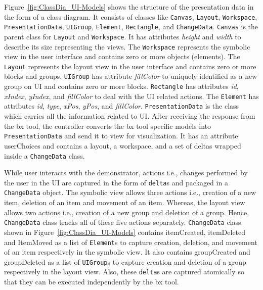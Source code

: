 Figure~\ref{fig:ClassDia_UI-Models} shows the structure of the presentation data in the form of a class diagram. It consists of classes like \texttt{Canvas}, \texttt{Layout}, \texttt{Workspace}, \texttt{PresentationData}, \texttt{UIGroup}, \texttt{Element}, \texttt{Rectangle}, and \texttt{ChangeData}. \texttt{Canvas} is the parent class for \texttt{Layout} and \texttt{Workspace}. It has attributes \textit{height} and \textit{width} to describe its size representing the views. The \texttt{Workspace} represents the symbolic view in the user interface and contains zero or more objects (elements). The \texttt{Layout} represents the layout view in the user interface and contains zero or more blocks and groups. \texttt{UIGroup} has attribute \textit{fillColor} to uniquely identified as a new group on UI and contains zero or more blocks. \texttt{Rectangle} has attributes \textit{id}, \textit{xIndex}, \textit{yIndex}, and \textit{fillColor} to deal with the UI related actions. The \texttt{Element} has attributes \textit{id}, \textit{type}, \textit{xPos}, \textit{yPos}, and \textit{fillColor}. \texttt{PresentationData} is the class which carries all the information related to UI. After receiving the response from the bx tool, the controller converts the bx tool specific models into \texttt{PresentationData} and send it to view for visualization. It has an attribute userChoices and contains a layout, a workspace, and a set of deltas wrapped inside a \texttt{ChangeData} class.

While user interacts with the demonstrator, actions i.e., changes performed by the user in the UI are captured in the form of \texttt{delta}s and packaged in a \texttt{ChangeData} object. The symbolic view allows three actions i.e., creation of a new item, deletion of an item and movement of an item. Whereas, the layout view allows two actions i.e., creation of a new group and deletion of a group. Hence, \texttt{ChangeData} class tracks all of these five actions separately. \texttt{ChangeData} class shown in Figure~\ref{fig:ClassDia_UI-Models} contains itemCreated, itemDeleted and ItemMoved as a list of \texttt{Element}s to capture creation, deletion, and movement of an item respectively in the symbolic view. It also contains groupCreated and groupDeleted as a list of \texttt{UIGroup}s to capture creation and deletion of a group respectively in the layout view. Also, these \texttt{delta}s are captured atomically so that they can be executed independently by the bx tool.

